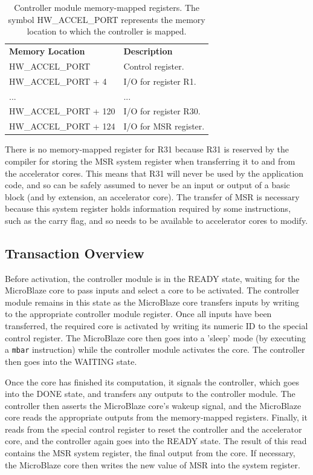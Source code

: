 \documentclass{UoYCSproject}
\begin{document}
\begin{table}[H]
\centering
\begin{tabular}{ |p{6cm}|p{7cm} }
\textbf{Memory Location}   & \textbf{Description}        \\
HW\_ACCEL\_PORT            & Control register.         \\[0.05cm]
HW\_ACCEL\_PORT + 4        & I/O for register R1.      \\[0.05cm]
...                        & ...                       \\[0.05cm]
HW\_ACCEL\_PORT + 120      & I/O for register R30.     \\[0.05cm]
HW\_ACCEL\_PORT + 124      & I/O for MSR register.     \\[0.05cm]
\end{tabular}
\caption{Controller module memory-mapped registers. The symbol HW\_ACCEL\_PORT represents the memory location to which the controller is mapped.}
\label{table:controllerRegisters}
\end{table}

There is no memory-mapped register for R31 because R31 is reserved by the compiler for storing the MSR system register when
transferring it to and from the accelerator cores. This means that R31 will never be used by the application code, and so
can be safely assumed to never be an input or output of a basic block (and by extension, an accelerator core). The transfer
of MSR is necessary because this system register holds information required by some instructions, such as the carry flag,
and so needs to be available to accelerator cores to modify.

\subsection{Transaction Overview}

Before activation, the controller module is in the READY state, waiting for the MicroBlaze core to pass inputs and select
a core to be activated. The controller module remains in this state as the MicroBlaze core transfers inputs by writing to
the appropriate controller module register. Once all inputs have been transferred, the required core is activated by writing
its numeric ID to the special control register. The MicroBlaze core then goes into a 'sleep' mode (by executing a \texttt{mbar}
instruction) while the controller module activates the core. The controller then goes into the WAITING state.

Once the core has finished its computation, it signals the controller, which goes into the DONE state, and transfers any outputs
to the controller module. The controller then asserts the MicroBlaze core's wakeup signal, and the MicroBlaze core reads
the appropriate outputs from the memory-mapped registers. Finally, it reads from the special control register to reset the
controller and the accelerator core, and the controller again goes into the READY state. The result of this read contains
the MSR system register, the final output from the core. If necessary, the MicroBlaze core then writes the new value of MSR into
the system register.
\end{document}
